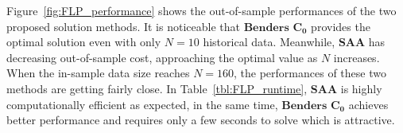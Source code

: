 \documentclass{article}
\begin{document}
Figure~\ref{fig:FLP_performance} shows the out-of-sample performances of the two proposed solution methods. It is noticeable that $\textbf{Benders $\mathbf{C_0}$}$ provides the optimal solution even with only $N = 10$ historical data. Meanwhile, $\textbf{SAA}$ has decreasing out-of-sample cost, approaching the optimal value as $N$ increases. When the in-sample data size reaches $N = 160$, the performances of these two methods are getting fairly close. In Table~\ref{tbl:FLP_runtime}, $\textbf{SAA}$ is highly computationally efficient as expected, in the same time, $\textbf{Benders $\mathbf{C_0}$}$ achieves better performance and requires only a few seconds to solve which is attractive. 
\end{document}
